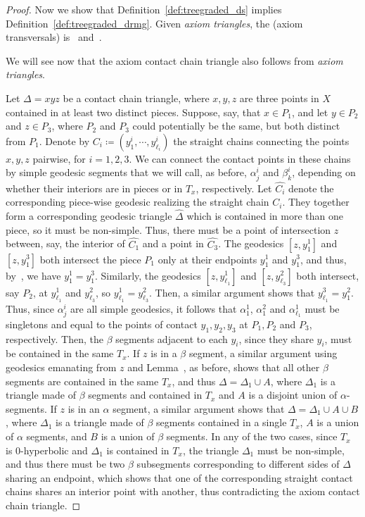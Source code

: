 \documentclass[12pt,article]{amsart}
\numberwithin{equation}{section}
\numberwithin{figure}{section}
\theoremstyle{definition}
\theoremstyle{plain}
\begin{document}
\begin{proof}
Now we show that Definition~\ref{def:treegraded_ds} implies Definition~\ref{def:treegraded_drmg}.
Given \emph{axiom triangles}, the (axiom transversals) is~\cite[Lemma~2.12]{DS05:Treegraded} and~\cite[Lemma~2.13]{DS05:Treegraded}.


We will see now that the axiom contact chain triangle also follows from \emph{axiom triangles}.

Let $\Delta=xyz$ be a contact chain triangle, where $x,y,z$ are three points in $X$ contained in at least two distinct pieces. Suppose, say, that $x \in P_1$, and let $y \in P_2$ and $z \in P_3$, where $P_2$ and $P_3$ could potentially be the same, but both distinct from $P_1$. Denote by $C_i \coloneqq (y^i_1,\cdots,y^i_{\ell_i})$ the straight chains connecting the points $x,y,z$ pairwise, for $i=1,2,3$.
We can connect the contact points in these chains by simple geodesic segments that we will call, as before, $\alpha^i_j$ and $\beta^i_k$, depending on whether their interiors are in pieces or in $T_x$, respectively. Let $\hat{C_i}$ denote the corresponding piece-wise geodesic realizing the straight chain $C_i$. They together form a corresponding geodesic triangle $\hat{\Delta}$ which is contained in more than one piece, so it must be non-simple. Thus, there must be a point of intersection $z$ between, say, the interior of $\hat{C_1}$ and a point in $\hat{C_3}$.
The geodesics $[z, y^1_1]$ and $[z, y^3_1]$ both intersect the piece $P_1$ only at their endpoints $y^1_1$ and $y^3_1$, and thus, by~\cite[Lemma~2.4]{DS05:Treegraded}, we have $y^1_1=y^3_1$.
Similarly, the geodesics $[z, y^1_{\ell_1}]$ and $[z, y^2_{\ell_3}]$ both intersect, say $P_2$, at $y^1_{\ell_1}$ and $y^2_{\ell_3}$, so $y^1_{\ell_1}=y^2_{\ell_3}$. Then, a similar argument shows that $y^3_{\ell_1}= y^2_{1}$. Thus, since $\alpha^i_j$ are all simple geodesics, it follows that $\alpha^1_1$, $\alpha^2_1$ and $\alpha^1_{\ell_1}$ must be singletons and equal to the points of contact $y_1, y_2, y_3$ at $P_1, P_2$ and $P_3$, respectively.
Then, the $\beta$ segments adjacent to each $y_i$, since they share $y_i$, must be contained in the same $T_x$.
If $z$ is in a $\beta$ segment, 
a similar argument using geodesics emanating from $z$ and Lemma~\cite[Lemma~2.4]{DS05:Treegraded}, as before, shows that all other $\beta$ segments are contained in the same $T_x$, and thus $\Delta=\Delta_1 \cup A$, where $\Delta_1$ is a triangle made of $\beta$ segments and contained in $T_x$ and $A$ is a disjoint union of $\alpha$-segments.
If $z$ is in an $\alpha$ segment, a similar argument shows that $\Delta=\Delta_1 \cup A \cup B$, where $\Delta_1$ is a triangle made of $\beta$ segments contained in a single $T_x$, $A$ is a union of $\alpha$ segments, and $B$ is a union of $\beta$ segments. 
In any of the two cases, since $T_x$ is $0$-hyperbolic and $\Delta_1$ is contained in $T_x$, the triangle $\Delta_1$ must be non-simple, and thus there must be two $\beta$ subsegments corresponding to different sides of $\Delta$ sharing an endpoint, which shows that one of the corresponding straight contact chains shares an interior point with another, thus contradicting the axiom contact chain triangle.
\end{proof}



\end{document}
